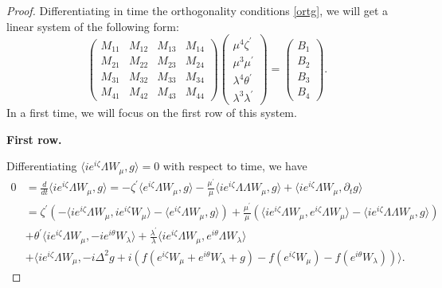 \documentclass[a4paper,two-side,10pt]{amsart}
\numberwithin{equation}{section}
\begin{document}
\begin{proof}
Differentiating in time the orthogonality conditions \eqref{ortg}, we will get a linear system of the following form: 
$$\begin{pmatrix} M_{11} & M_{12} & M_{13} & M_{14}\\  M_{21} & M_{22} & M_{23} & M_{24}\\  M_{31} & M_{32} & M_{33} & M_{34}\\ M_{41} & M_{42} & M_{43} & M_{44}  \end{pmatrix} \begin{pmatrix}\mu^4 \zeta^\prime \\ \mu^3 \mu^\prime \\ \lambda^4 \theta^\prime \\ \lambda^3 \lambda^\prime \end{pmatrix} =\begin{pmatrix} B_1 \\ B_2 \\ B_3 \\ B_4 \end{pmatrix}.$$
In a first time, we will focus on the first row of this system. 

 {\bf First row.}

Differentiating $\langle ie^{i\zeta} \Lambda W_\mu ,g\rangle =0$ with respect to time, we have
\begin{align*}
0&= \frac{d}{dt} \langle ie^{i\zeta} \Lambda W_\mu ,g\rangle = - \zeta^\prime \langle e^{i\zeta} \Lambda W_\mu ,g \rangle - \frac{\mu^\prime}{\mu} \langle ie^{i\zeta} \Lambda \Lambda W_\mu ,g \rangle + \langle ie^{i\zeta} \Lambda W_\mu ,\partial_t g \rangle \\
&= \zeta^\prime (- \langle i e^{i\zeta} \Lambda W_\mu , i e^{i\zeta} W_\mu \rangle - \langle e^{i\zeta} \Lambda W_\mu ,g \rangle) +\frac{\mu^\prime}{\mu} (\langle  i e^{i\zeta} \Lambda W_\mu , e^{i\zeta} \Lambda W_\mu\rangle - \langle i e^{i\zeta} \Lambda \Lambda W_\mu ,g \rangle)\\
&+\theta^\prime \langle ie^{i\zeta} \Lambda W_\mu ,-i e^{i\theta} W_\lambda \rangle +\frac{\lambda^\prime}{\lambda} \langle ie^{i\zeta} \Lambda W_\mu , e^{i\theta} \Lambda W_\lambda \rangle \\
&+ \langle i e^{i\zeta} \Lambda W_\mu , -i \Delta^2 g +i (f(e^{i\zeta} W_\mu +e^{i\theta} W_\lambda +g) - f(e^{i\zeta} W_\mu) - f(e^{i\theta} W_\lambda)) \rangle .
\end{align*}


\end{proof}
\end{document}
